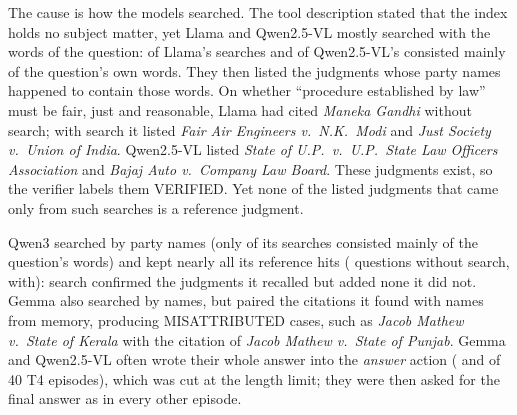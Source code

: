 The cause is how the models searched. The tool description stated that the index holds no subject matter, yet Llama and Qwen2.5-VL mostly searched with the words of the question: \SearchTopicQLlama{} of Llama's \SearchSearchesLlama{} searches and \SearchTopicQQwenVL{} of Qwen2.5-VL's \SearchSearchesQwenVL{} consisted mainly of the question's own words. They then listed the judgments whose party names happened to contain those words. On whether ``procedure established by law'' must be fair, just and reasonable, Llama had cited \emph{Maneka Gandhi} without search; with search it listed \emph{Fair Air Engineers v.\ N.K.\ Modi} and \emph{Just Society v.\ Union of India}. Qwen2.5-VL listed \emph{State of U.P.\ v.\ U.P.\ State Law Officers Association} and \emph{Bajaj Auto v.\ Company Law Board}. These judgments exist, so the verifier labels them VERIFIED. Yet none of the \SearchTopicCasesAll{} listed judgments that came only from such searches is a reference judgment.

Qwen3 searched by party names (only \SearchTopicQQwen{} of its \SearchSearchesQwen{} searches consisted mainly of the question's words) and kept nearly all its reference hits (\RefClosedQwen{} questions without search, \RefSearchQwen{} with): search confirmed the judgments it recalled but added none it did not. Gemma also searched by names, but paired the citations it found with names from memory, producing \SearchTFourMisGemma{} MISATTRIBUTED cases, such as \emph{Jacob Mathew v.\ State of Kerala} with the citation of \emph{Jacob Mathew v.\ State of Punjab}. Gemma and Qwen2.5-VL often wrote their whole answer into the \emph{answer} action (\SearchTFourInvalidActionGemma{} and \SearchTFourInvalidActionQwenVL{} of 40 T4 episodes), which was cut at the length limit; they were then asked for the final answer as in every other episode.

\begin{table}[t]
\caption{T4 under five conditions: from memory, after verifier feedback (T5 answers where revised, T4 otherwise), with name search over the index metadata, and with topic search over headnotes without and with the citation prior. Ref.\ = questions (of \NumTopics) whose list includes a judgment that decided the question; N.F.\ = listed cases the verifier could not find.}
\label{tab:t4conds}
\centering
\footnotesize
\setlength{\tabcolsep}{4pt}

\end{table}
